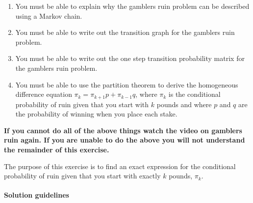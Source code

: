 \documentclass[a4paper]{article}
\begin{document}
\begin{enumerate}
 \item You must be able to explain why the gamblers ruin problem can be described using a Markov chain.
 \item You must be able to write out the transition graph for the gamblers ruin problem.
 \item You must be able to write out the one step transition probability matrix for the gamblers ruin problem.
 \item You must be able to use the partition theorem to derive the homogeneous difference equation $\pi_k = \pi_{k+1} p + \pi_{k-1} q$, where $\pi_k$ is the conditional probability of ruin given that
you start with $k$ pounds and where $p$ and $q$ are the probability of winning when you place each stake.
\end{enumerate}

{\bf If you cannot do all of the above things watch the video on gamblers ruin again.  If you are unable to do the above you will not understand the remainder of this exercise.}

The purpose of this exercise is to find an exact expression for the conditional probability of ruin given that you start with exactly $k$ pounds, $\pi_k$.

\clearpage

\paragraph{Solution guidelines}
\end{document}
